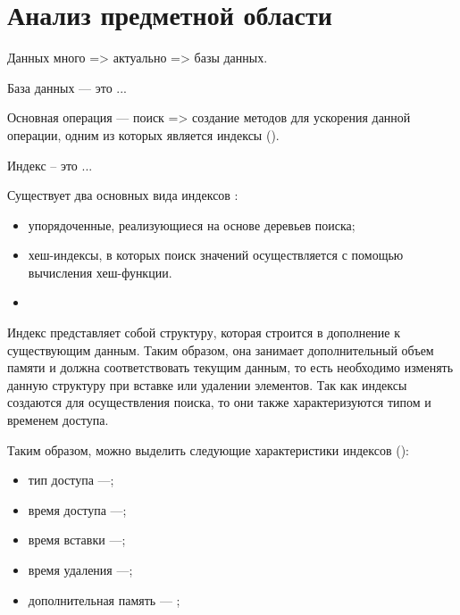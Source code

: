 \chapter{Анализ предметной области}

Данных много => актуально => базы данных.

База данных --- это ...

Основная операция --- поиск => создание методов для ускорения данной операции,
одним из которых является индексы ().

Индекс -- это ...

Существует два основных вида индексов :

\begin{itemize}
    \item упорядоченные, реализующиеся на основе деревьев поиска;
    \item хеш-индексы, в которых поиск значений осуществляется с помощью
        вычисления хеш-функции.
    \item {}
\end{itemize}

Индекс представляет собой структуру, которая строится в дополнение к
существующим данным. Таким образом, она занимает дополнительный объем памяти и
должна соответствовать текущим данным, то есть необходимо изменять данную
структуру при вставке или удалении элементов. Так как индексы создаются для
осуществления поиска, то они также характеризуются типом и временем доступа.

Таким образом, можно выделить следующие характеристики индексов ():


\begin{itemize}
    \item тип доступа ---;
    \item время доступа ---;
    \item время вставки ---;
    \item время удаления ---;
    \item дополнительная память --- ;
\end{itemize}
